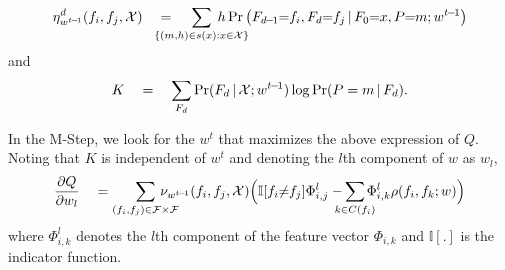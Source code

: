 \begin{equation*}
\eta_{w^{t\hspace{-1pt}-\hspace{-1pt}1}}^{d}(f_{i},f_{j},\mathcal{X})\quad= \hspace{-15pt}\sum\limits_{\{(m,h) \in s(x):x \in \mathcal{X}\}}\hspace{-24pt}h \Pr\big(F_{d\hspace{-1pt}-\hspace{-1pt}1}\hspace{-3pt}=\hspace{-3pt}f_{i},F_{d}\hspace{-3pt}=\hspace{-3pt}f_{j} \,|\, F_{0}\hspace{-3pt}=\hspace{-3pt}x, P\hspace{-3pt}=\hspace{-3pt}m; w^{t\hspace{-1pt}-\hspace{-1pt}1}\big)
\end{equation*}
and
\begin{equation*}
K \quad=\quad \sum\limits_{F_{d}}\Pr(F_{d}\,|\, \mathcal{X}; w^{t\hspace{-1pt}-\hspace{-1pt}1})\log\Pr(P=m \,|\, F_{d}).
\end{equation*}

In the M-Step, we look for the $w^{t}$ that maximizes the above expression of $Q$. Noting that $K$ is independent of $w^{t}$ and denoting the $l$th component of $w$ as $w_{l}$, 
\begin{equation}
\label{gradEquation}
\frac{\partial Q}{\partial w_{l}} \quad= \sum\limits_{(f_{i},f_{j}) \in \mathcal{F}\times\mathcal{F}} \hspace{-15pt}\nu_{w^{t\hspace{-1pt}-\hspace{-1pt}1}}(f_{i},f_{j},\mathcal{X})\Big(\mathbb{I}[f_{i}\hspace{-3pt}\neq\hspace{-3pt}f_{j}]\Phi_{i,j}^{l} - \hspace{-8pt}\sum\limits_{k\in C(f_{i})}\hspace{-8pt}\Phi_{i,k}^{l}\rho(f_{i},f_{k};w)\Big)
\end{equation}
where $\Phi_{i,k}^{l}$ denotes the $l$th component of the feature vector $\Phi_{i,k}$ and $\mathbb{I}[.]$ is the indicator function.

